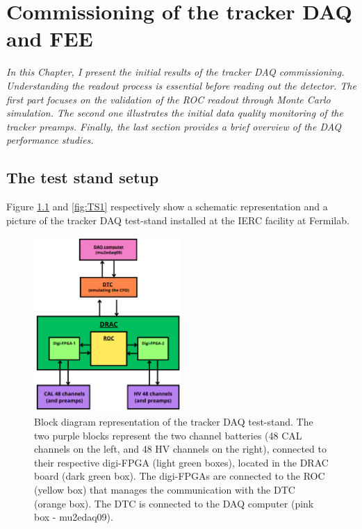 \chapter{Commissioning of the tracker DAQ and FEE}
\textit{In this Chapter, I present the initial results of the tracker DAQ commissioning. 
Understanding the readout process is essential before reading out the detector. 
The first part focuses on the validation of the ROC readout through Monte Carlo simulation. 
The second one illustrates the initial data quality monitoring of the tracker preamps. 
Finally, the last section provides a brief overview of the DAQ performance studies.
}

  \section{The test stand setup}\label{des}
  Figure \ref{fig:blockdiagram} and \ref{fig:TS1} respectively show a 
  schematic representation and a picture of the tracker DAQ test-stand 
  installed at the IERC facility at Fermilab.
  \begin{figure}[!h]
    \centering
    \includegraphics[width =0.5\textwidth]{figures/png/Screenshot_20240712_102528.png}
    \caption[Block diagram representation of the tracker DAQ test-stand]{Block diagram representation of the tracker DAQ test-stand. The two purple 
    blocks represent the two channel batteries (48 CAL channels on the left, 
    and 48 HV channels on the right), connected to their respective digi-FPGA 
    (light green boxes), located in the DRAC board (dark green box). The 
    digi-FPGAs are connected to the ROC (yellow box) that manages the communication with the
    DTC (orange box). The DTC is connected to the DAQ 
    computer (pink box - mu2edaq09).}
    \label{fig:blockdiagram}
    \end{figure}







